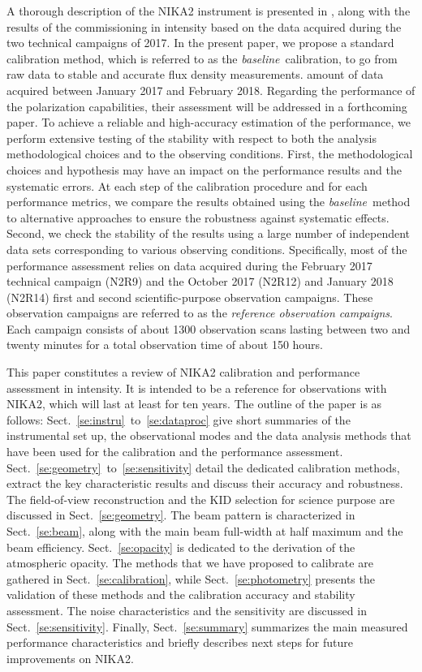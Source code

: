 \documentclass[traditionalabstract]{aa}
\newcommand{\baseline}{\emph{baseline}}
\newcommand{\lp}[1]{#1}
\begin{document}
A thorough description of the NIKA2 instrument is presented in \citet{Adam2018},
along with the results of the commissioning in intensity based on the
data acquired during the two technical campaigns of 2017.
%
{\lp In the present paper, we propose a standard calibration method, which is
referred to as the \baseline\ calibration, to go from raw data to
stable and accurate flux density measurements.} 
amount of data acquired between January 2017 and February 2018.
Regarding the performance of the polarization capabilities, their
assessment will be addressed in a forthcoming paper.
To achieve a reliable and high-accuracy estimation
of the performance, we perform extensive testing of the
stability with respect to both the analysis methodological
choices and to the observing conditions.
{\lp First, the methodological choices and hypothesis may have an impact on
the performance results and the systematic errors. At each step of the
calibration procedure and for each performance metrics, we compare the
results obtained using the \baseline\ method to alternative approaches to
ensure the robustness against systematic effects.}
Second, we check the stability of the results using a large number of
independent data sets corresponding to various observing conditions.
Specifically, most of the performance assessment relies on data
acquired during the February 2017 technical campaign (N2R9) and the
October 2017 (N2R12) and January 2018 (N2R14) first and second
scientific-purpose observation campaigns. {\lp These observation
campaigns are referred to as the \emph{reference observation campaigns}.}
Each campaign consists of about 1300 observation scans lasting between
two and twenty minutes for a total observation time of about 150 hours. 

This paper constitutes a review of NIKA2 calibration and
performance assessment in intensity. It is intended to be a reference
for observations with NIKA2, which will last at least for ten years. 
The outline of the paper is as follows:
Sect.~\ref{se:instru}~to~\ref{se:dataproc} give short summaries of the
instrumental set up, the observational modes and the data analysis methods
that have been used for the calibration and the performance
assessment. Sect.~\ref{se:geometry}~to~\ref{se:sensitivity} detail the
dedicated calibration methods, extract the key characteristic results
and discuss their accuracy and robustness. The field-of-view
reconstruction and the KID selection for science purpose are discussed
in Sect.~\ref{se:geometry}. The beam pattern is characterized in
Sect.~\ref{se:beam}, along with the main beam
full-width at half maximum and the beam
efficiency. Sect.~\ref{se:opacity} is dedicated to the derivation of
the atmospheric opacity. The methods that we have proposed to
calibrate are gathered in Sect.~\ref{se:calibration}, while
Sect.~\ref{se:photometry} presents the validation of these methods and
the calibration accuracy and stability assessment. The noise
characteristics and the sensitivity are discussed in
Sect.~\ref{se:sensitivity}. Finally, Sect.~\ref{se:summary} summarizes
the main measured performance characteristics and {\lp briefly
describes next steps for future improvements on NIKA2.}
\end{document}
